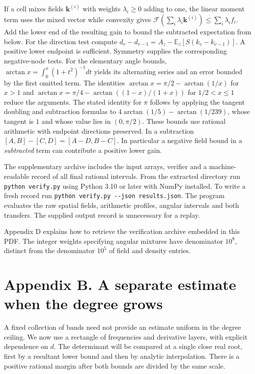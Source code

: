 \documentclass[11pt,a4paper]{article}
\begin{document}
If a cell mixes fields \(\mathbf k^{(i)}\) with weights \(\lambda_i\ge0\) adding to one, the linear moment term uses the mixed vector while convexity gives \(\mathcal F(\sum_i\lambda_i\mathbf k^{(i)})\le\sum_i\lambda_i f_i\). Add the lower end of the resulting gain to bound the subtracted expectation from below. For the direction test compute \(d_v-d_{v-1}=A_z-\mathbb E_z[S(k_v-k_{v-1})]\). A positive lower endpoint is sufficient. Symmetry supplies the corresponding negative-node tests. For the elementary angle bounds, \(\arctan x=\int_0^x(1+t^2)^{-1}dt\) yields its alternating series and an error bounded by the first omitted term. The identities \(\arctan x=\pi/2-\arctan(1/x)\) for \(x>1\) and \(\arctan x=\pi/4-\arctan((1-x)/(1+x))\) for \(1/2<x\le1\) reduce the arguments. The stated identity for \(\pi\) follows by applying the tangent doubling and subtraction formulas to \(4\arctan(1/5)-\arctan(1/239)\), whose tangent is \(1\) and whose value lies in \((0,\pi/2)\). These bounds use rational arithmetic with endpoint directions preserved. In a subtraction \([A,B]-[C,D]=[A-D,B-C]\). In particular a negative field bound in a \emph{subtracted} term can contribute a positive lower gain.

The supplementary archive includes the input arrays, verifier and a machine-readable record of all final rational intervals. From the extracted directory run \texttt{python\ verify.py} using Python 3.10 or later with NumPy installed. To write a fresh record run \texttt{python\ verify.py\ -\/-json\ results.json}. The program evaluates the raw spatial fields, arithmetic profiles, angular intervals and both transfers. The supplied output record is unnecessary for a replay.

Appendix D explains how to retrieve the verification archive embedded in this PDF. The integer weights specifying angular mixtures have denominator \(10^8\), distinct from the denominator \(10^5\) of field and density entries.

\section{Appendix B. A separate estimate when the degree grows}\label{appendix-b.-a-separate-estimate-when-the-degree-grows}

A fixed collection of bands need not provide an estimate uniform in the degree ceiling. We now use a rectangle of frequencies and derivative layers, with explicit dependence on \(d\). The determinant will be compared at a single close real root, first by a resultant lower bound and then by analytic interpolation. There is a positive rational margin after both bounds are divided by the same scale.
\end{document}
